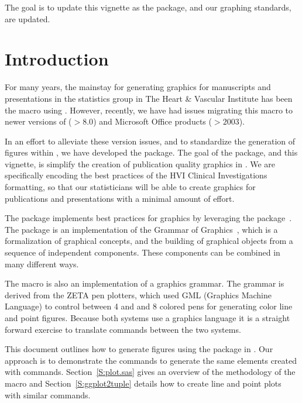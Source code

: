 \documentclass[nojss]{jss}\usepackage[]{graphicx}\usepackage[]{color}
\begin{document}
The goal is to update this vignette as the package, and our graphing standards, are updated. 

\section{Introduction}
For many years, the mainstay for generating graphics for manuscripts and presentations in the statistics group in The Heart \& Vascular Institute has been the  macro using . However, recently, we have had issues migrating this macro to newer versions of  ($> 8.0$) and Microsoft Office products ($> 2003$). 

In an effort to alleviate these version issues, and to standardize the generation of figures within , we have developed the   package. The goal of the package, and this vignette, is simplify the creation of publication quality graphics in  . We are specifically encoding the best practices of the HVI Clinical Investigations formatting, so that our statisticians will be able to create graphics for publications and presentations with a minimal amount of effort.

The  package implements best practices for  graphics by leveraging the  package~\citep{Wickham:2009}. The  package is an implementation of the Grammar of Graphics~\citep{Wilkinson:2005}, which is a formalization of graphical concepts, and the building of graphical objects from a sequence of independent components. These components can be combined in many different ways.

The  macro is also an implementation of a graphics grammar. The grammar  is derived from the ZETA pen plotters, which used GML (Graphics Machine Language) to control between 4 and and 8 colored pens for generating color line and point figures. Because both systems use a graphics language it is a straight forward exercise to translate commands between the two systems. 

This document outlines how to generate figures using the  package in . Our approach is to demonstrate the  commands to generate the same elements created with  commands. Section~\ref{S:plot.sas} gives an overview of the methodology of the  macro and Section~\ref{S:ggplot2tuple} details how to create line and point plots with similar  commands. 
\end{document}
